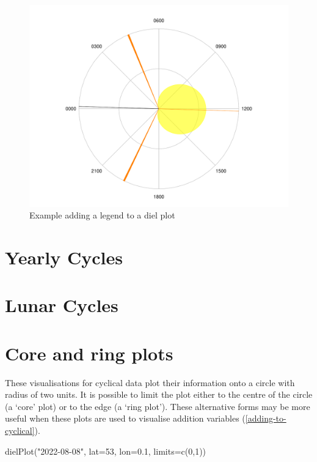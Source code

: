 \documentclass[
]{book}
\newenvironment{Shaded}{\begin{snugshade}}{\end{snugshade}}
\newcommand{\AttributeTok}[1]{\textcolor[rgb]{0.77,0.63,0.00}{#1}}
\newcommand{\DecValTok}[1]{\textcolor[rgb]{0.00,0.00,0.81}{#1}}
\newcommand{\FloatTok}[1]{\textcolor[rgb]{0.00,0.00,0.81}{#1}}
\newcommand{\FunctionTok}[1]{\textcolor[rgb]{0.00,0.00,0.00}{#1}}
\newcommand{\NormalTok}[1]{#1}
\newcommand{\StringTok}[1]{\textcolor[rgb]{0.31,0.60,0.02}{#1}}
\begin{document}
\begin{figure}

{\centering \includegraphics[width=0.9\linewidth]{_main_files/figure-latex/diel-plot-components-1} 

}

\caption{Example adding a legend to a diel plot}\label{fig:diel-plot-components}
\end{figure}

\hypertarget{yearly-cycles}{%
\section{Yearly Cycles}\label{yearly-cycles}}

\hypertarget{lunar-cycles}{%
\section{Lunar Cycles}\label{lunar-cycles}}

\hypertarget{core-and-ring-plots}{%
\section{Core and ring plots}\label{core-and-ring-plots}}

These visualisations for cyclical data plot their information onto a circle with radius of two units. It is possible to limit the plot either to the centre of the circle (a `core' plot) or to the edge (a `ring plot'). These alternative forms may be more useful when these plots are used to visualise addition variables (\ref{adding-to-cyclical}).

\begin{Shaded}
\begin{Highlighting}[]
\FunctionTok{dielPlot}\NormalTok{(}\StringTok{"2022{-}08{-}08"}\NormalTok{, }\AttributeTok{lat=}\DecValTok{53}\NormalTok{, }\AttributeTok{lon=}\FloatTok{0.1}\NormalTok{, }\AttributeTok{limits=}\FunctionTok{c}\NormalTok{(}\DecValTok{0}\NormalTok{,}\DecValTok{1}\NormalTok{))}
\end{Highlighting}
\end{Shaded}
\end{document}
